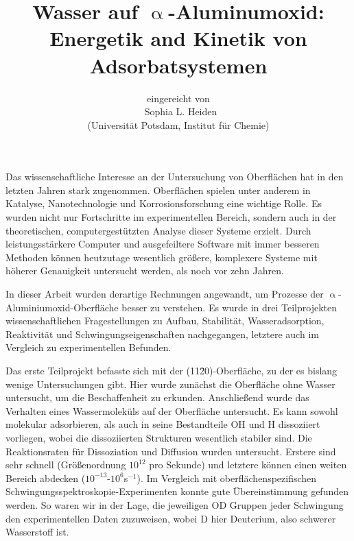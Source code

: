 \documentclass[11pt,DIV=13,a4paper,headinclude,german]{scrartcl}
\begin{document}
\titlehead{\centering\normalfont\large\scshape Allgemeinverständliche Zusammenfassung}
\title{\Large\vspace{-\baselineskip} Wasser auf $\upalpha$-Aluminumoxid:\\
  Energetik and Kinetik von Adsorbatsystemen \vspace{0\baselineskip}}
\author{\large\sffamily eingereicht von\\
  \Large\textbf\sffamily\ Sophia L. Heiden\\
  \large\sffamily (Universit\"{a}t Potsdam, Institut f\"{u}r Chemie)}
\date{}
\maketitle
\vspace{-1cm}
Das wissenschaftliche Interesse an der Untersuchung von Oberflächen hat in den letzten Jahren stark zugenommen.
Oberflächen spielen unter anderem in Katalyse, Nanotechnologie und Korrosionsforschung eine wichtige Rolle.
Es wurden nicht nur Fortschritte im experimentellen Bereich, sondern auch in der theoretischen, computergestützten Analyse dieser Systeme erzielt.
Durch leistungsstärkere Computer und ausgefeiltere Software mit immer besseren Methoden können heutzutage wesentlich größere, komplexere Systeme mit höherer Genauigkeit untersucht werden, als noch vor zehn Jahren.

In dieser Arbeit wurden derartige Rechnungen angewandt, um Prozesse der $\upalpha$-Aluminiumoxid-Oberfläche besser zu verstehen.
Es wurde in drei Teilprojekten wissenschaftlichen Fragestellungen zu Aufbau, Stabilität, Wasseradsorption, Reaktivität und Schwingungseigenschaften nachgegangen, letztere auch im Vergleich zu experimentellen Befunden.

Das erste Teilprojekt befasste sich mit der (11\=20)-Oberfläche, zu der es bislang wenige Untersuchungen gibt.
Hier wurde zunächst die Oberfläche ohne Wasser %
untersucht, um die Beschaffenheit zu erkunden.
Anschließend wurde das Verhalten eines Wassermoleküls auf der Oberfläche untersucht.
Es kann sowohl molekular adsorbieren, als auch in seine Bestandteile OH und H dissoziiert vorliegen, wobei die dissoziierten Strukturen wesentlich stabiler sind.
Die Reaktionsraten für Dissoziation und Diffusion wurden untersucht. Erstere sind sehr schnell (Größenordnung $10^{12}$ pro Sekunde) und letztere können einen weiten Bereich abdecken ($10^{-13}$-$10^6$s$^{-1}$).
Im Vergleich mit oberflächenspezifischen Schwin\-gungs\-spek\-tros\-ko\-pie-Experimenten konnte gute Übereinstimmung gefunden werden.
So waren wir in der Lage, die jeweiligen OD Gruppen jeder Schwingung den experimentellen Daten zuzuweisen, wobei D hier Deuterium, also schwerer Wasserstoff ist.
\end{document}

